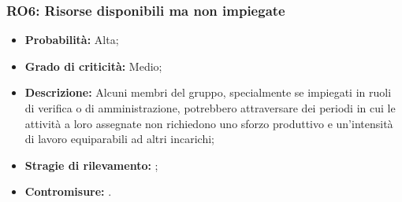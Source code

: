 \subsubsection{RO6: Risorse disponibili ma non impiegate}
\begin{itemize}
    \item \textbf{Probabilità:} Alta;
    \item \textbf{Grado di criticità:} Medio;
    \item \textbf{Descrizione:} Alcuni membri del gruppo, specialmente se impiegati in ruoli di verifica o di amministrazione, potrebbero attraversare dei periodi in cui le attività a loro assegnate non richiedono uno sforzo produttivo e un’intensità di lavoro equiparabili ad altri incarichi;
    \item \textbf{Stragie di rilevamento:} ;
    \item \textbf{Contromisure:} . 
\end{itemize}
